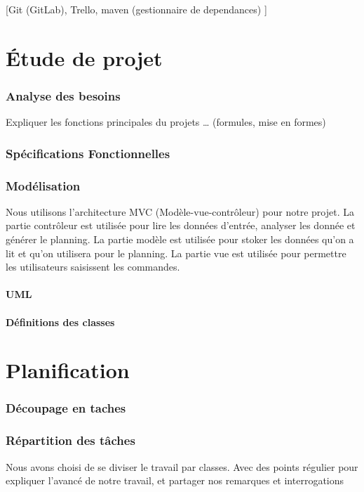 \documentclass{polytech/polytech}
\begin{document}
	[Git (GitLab), Trello, maven (gestionnaire de dependances) ]

	\part{Étude de projet}
	\section{Analyse des besoins}
	Expliquer les fonctions principales du projets … (formules, mise en formes)

	\section{Spécifications Fonctionnelles}

	\section{Modélisation}
	Nous utilisons l'architecture MVC (Modèle-vue-contrôleur) pour notre projet. La partie contrôleur est utilisée pour lire les données d'entrée, analyser les donnée et générer le planning. La partie modèle est utilisée pour stoker les données qu'on a lit et qu'on utilisera pour le planning. La partie vue est utilisée pour permettre les utilisateurs saisissent les commandes.

	\subsection{UML}
	
	\subsection{Définitions des classes}

	\part{Planification}

	\section{Découpage en taches}

	\section{Répartition des tâches}

	Nous avons choisi de se diviser le travail par classes.
	Avec des points régulier pour expliquer l'avancé de notre travail, et partager nos remarques et
	interrogations
\end{document}
